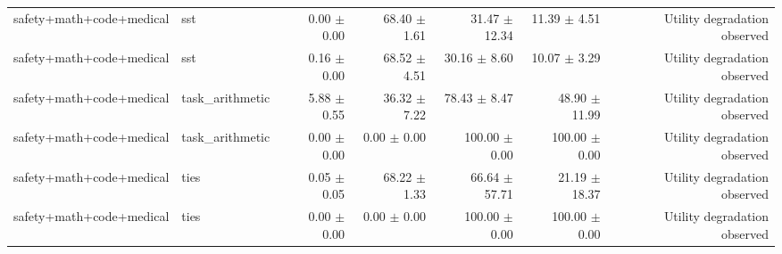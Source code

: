 \documentclass{article}
\begin{document}
\begin{table}[H]
{\begin{tabular}{llrrrrr}
safety+math+code+medical & sst & 0.00 $\pm$ 0.00 & 68.40 $\pm$ 1.61 & 31.47 $\pm$ 12.34 & 11.39 $\pm$ 4.51 & Utility degradation observed \\
safety+math+code+medical & sst & 0.16 $\pm$ 0.00 & 68.52 $\pm$ 4.51 & 30.16 $\pm$ 8.60 & 10.07 $\pm$ 3.29 & Utility degradation observed \\
safety+math+code+medical & task\_arithmetic & 5.88 $\pm$ 0.55 & 36.32 $\pm$ 7.22 & 78.43 $\pm$ 8.47 & 48.90 $\pm$ 11.99 & Utility degradation observed \\
safety+math+code+medical & task\_arithmetic & 0.00 $\pm$ 0.00 & 0.00 $\pm$ 0.00 & 100.00 $\pm$ 0.00 & 100.00 $\pm$ 0.00 & Utility degradation observed \\
safety+math+code+medical & ties & 0.05 $\pm$ 0.05 & 68.22 $\pm$ 1.33 & 66.64 $\pm$ 57.71 & 21.19 $\pm$ 18.37 & Utility degradation observed \\
safety+math+code+medical & ties & 0.00 $\pm$ 0.00 & 0.00 $\pm$ 0.00 & 100.00 $\pm$ 0.00 & 100.00 $\pm$ 0.00 & Utility degradation observed \\
\bottomrule
\end{tabular}
}
\end{table}


\begin{table}[H]
\centering
\caption{崩壊分析: safety+math条件におけるSST-Merge(GSM8K対象)の詳細指標と偽の安全性}
\label{tab:evaluation_yobi_main_GSM8K}
\small
{}
\end{table}
\end{document}

